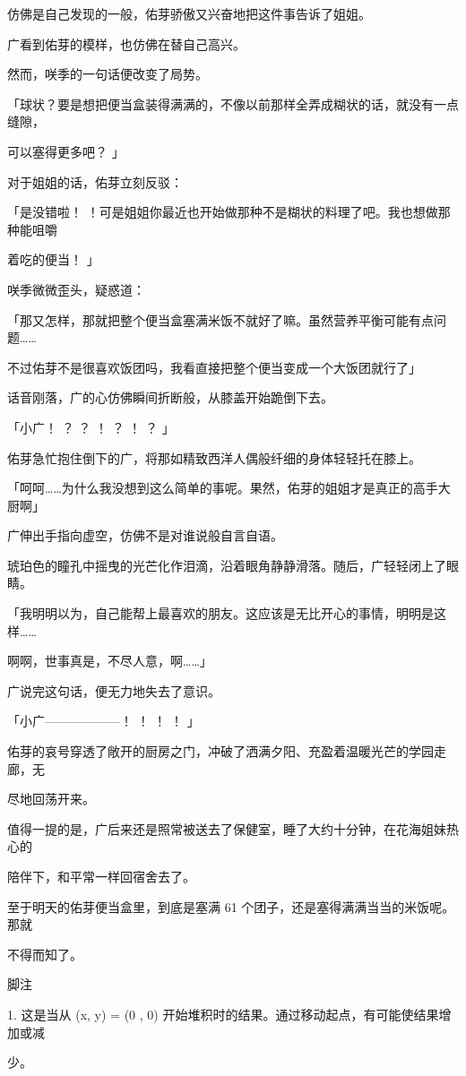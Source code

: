 仿佛是自己发现的一般，佑芽骄傲又兴奋地把这件事告诉了姐姐。\par
广看到佑芽的模样，也仿佛在替自己高兴。\par
然而，咲季的一句话便改变了局势。\par
「球状？要是想把便当盒装得满满的，不像以前那样全弄成糊状的话，就没有一点缝隙，\par
可以塞得更多吧？ 」\par
对于姐姐的话，佑芽立刻反驳：\par
「是没错啦！ ！可是姐姐你最近也开始做那种不是糊状的料理了吧。我也想做那种能咀嚼\par
着吃的便当！ 」\par
咲季微微歪头，疑惑道：\par
「那又怎样，那就把整个便当盒塞满米饭不就好了嘛。虽然营养平衡可能有点问题……\par
不过佑芽不是很喜欢饭团吗，我看直接把整个便当变成一个大饭团就行了」\par
话音刚落，广的心仿佛瞬间折断般，从膝盖开始跪倒下去。\par
「小广！ ？ ？ ！ ？ ！ ？ 」\par
佑芽急忙抱住倒下的广，将那如精致西洋人偶般纤细的身体轻轻托在膝上。\par
「呵呵……为什么我没想到这么简单的事呢。果然，佑芽的姐姐才是真正的高手大厨啊」\par
广伸出手指向虚空，仿佛不是对谁说般自言自语。\par
琥珀色的瞳孔中摇曳的光芒化作泪滴，沿着眼角静静滑落。随后，广轻轻闭上了眼睛。\par
「我明明以为，自己能帮上最喜欢的朋友。这应该是无比开心的事情，明明是这样……\par
啊啊，世事真是，不尽人意，啊……」\par
广说完这句话，便无力地失去了意识。\par
「小广——————！ ！ ！ ！ 」\par
佑芽的哀号穿透了敞开的厨房之门，冲破了洒满夕阳、充盈着温暖光芒的学园走廊，无\par
尽地回荡开来。\par
值得一提的是，广后来还是照常被送去了保健室，睡了大约十分钟，在花海姐妹热心的\par
陪伴下，和平常一样回宿舍去了。\par
至于明天的佑芽便当盒里，到底是塞满 61 个团子，还是塞得满满当当的米饭呢。那就\par
不得而知了。\par

脚注\par
1. 这是当从 (x, y) = (0 , 0) 开始堆积时的结果。通过移动起点，有可能使结果增加或减\par
少。\par

